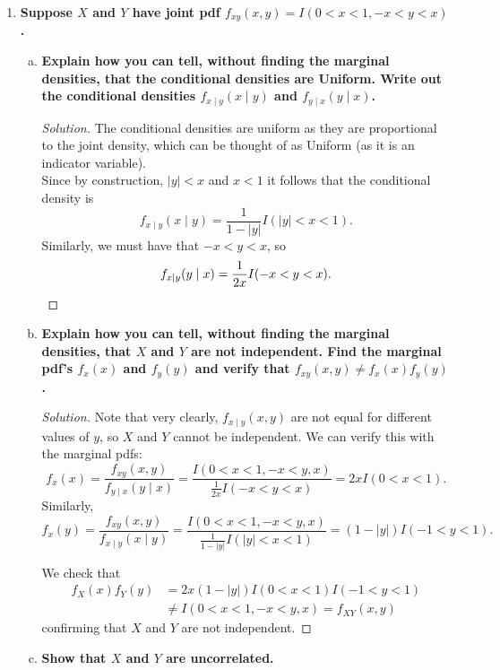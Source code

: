 \documentclass[11pt]{article}
\newenvironment{solution}
  {\renewcommand\qedsymbol{$\blacksquare$}\begin{proof}[Solution]}
  {\end{proof}}
\begin{document}
\begin{enumerate}
    \item \textbf{Suppose $X$ and $Y$ have joint pdf $f_{xy}(x, y) = I(0 < x < 1, -x < y < x)$.}
    \begin{enumerate}[a)]
      \item \textbf{Explain how you can tell, without finding the marginal densities, that the conditional densities are Uniform.
      Write out the conditional densities $f_{x \mid y}(x \mid y)$ and $f_{y \mid x}(y \mid x)$.}

      \begin{solution}
      The conditional densities are uniform as they are proportional to the joint density, which can be thought of as Uniform (as it is an indicator variable). \\

      Since by construction, $|y| < x$ and $x < 1$ it follows that the conditional density is
      \[
        f_{x \mid y}(x \mid y) = \frac{1}{1 - |y|} I(|y| < x < 1).
      \]
      Similarly, we must have that $-x < y < x$, so
      \[
        f_{x \mid y}(y \mid x) = \frac{1}{2x} I(-x < y < x). \qedhere
      \]\end{solution}
      \item \textbf{Explain how you can tell, without finding the marginal densities, that $X$ and $Y$ are not independent. Find the marginal pdf's $f_x(x)$ and $f_y(y)$ 
      and verify that $f_{xy}(x, y) \neq f_x(x)f_y(y)$.}

      \begin{solution}
      Note that very clearly, $f_{x \mid y}(x, y)$ are not equal for different values of $y$, so $X$ and $Y$ cannot be independent. We can verify this with the marginal pdfs:
      \[
        f_x(x) = \frac{f_{xy}(x, y)}{f_{y \mid x}(y \mid x)} = \frac{I(0 < x < 1, -x < y, x)}{\frac{1}{2x} I(-x < y < x)}= 2x I(0 < x < 1).
      \]
      Similarly, 
      \[
        f_x(y) = \frac{f_{xy}(x, y)}{f_{x \mid y}(x \mid y)} = \frac{I(0 < x < 1, -x < y, x)}{\frac{1}{1 - |y|} I(|y| < x < 1)}= (1- |y|) I(-1 < y < 1).
      \]

      We check that
      \begin{align*}
        f_X(x)f_Y(y) &= 2x(1-|y|) I(0 < x < 1) I(-1 < y < 1) \\
        &\neq I(0 < x < 1, -x < y, x) = f_{XY}(x, y)
      \end{align*}
      confirming that $X$ and $Y$ are not independent.
      \end{solution}

      \item \textbf{Show that $X$ and $Y$ are uncorrelated.}
      

\end{enumerate}
\end{enumerate}
\end{document}
